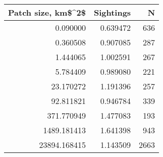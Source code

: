 \begin{tabular}{rrr}
\toprule
 Patch size, km\$\textasciicircum 2\$ &  Sightings &    N \\
\midrule
           0.090000 &   0.639472 &  636 \\
           0.360508 &   0.907085 &  287 \\
           1.444065 &   1.002591 &  267 \\
           5.784409 &   0.989080 &  221 \\
          23.170272 &   1.191396 &  257 \\
          92.811821 &   0.946784 &  339 \\
         371.770949 &   1.477083 &  193 \\
        1489.181413 &   1.641398 &  943 \\
       23894.168415 &   1.143509 & 2663 \\
\bottomrule
\end{tabular}
